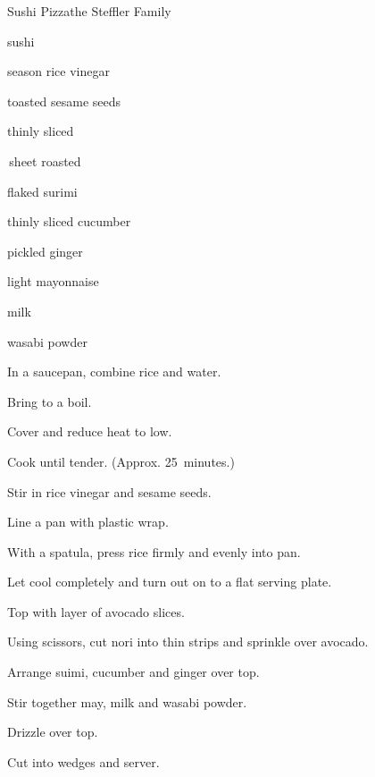 \begin{recipe}{Sushi Pizza}{the Steffler Family}{}

\begin{ingredients}
\item {} sushi 
\item \C{\quarter} season rice vinegar
\item {} toasted sesame seeds
\item \half thinly sliced 
\item \half\,sheet roasted 
\item \C{\threequarter} flaked surimi
\item \C{\half} thinly sliced cucumber
\item {} pickled ginger
\item {} light mayonnaise
\item {} milk
\item {} wasabi powder
\end{ingredients}

\begin{directions}
\item In a saucepan, combine rice and \C{1\quarter} water.
\item Bring to a boil.
\item Cover and reduce heat to low.
\item Cook until tender. (Approx. 25~minutes.)
\item Stir in rice vinegar and sesame seeds.
\item Line a pan with plastic wrap.
\item With a spatula, press rice firmly and evenly into pan.
\item Let cool completely and turn out on to a flat serving plate.
\item Top with layer of avocado slices.
\item Using scissors, cut nori into thin strips and sprinkle over avocado.
\item Arrange suimi, cucumber and ginger over top.
\item Stir together may, milk and wasabi powder.
\item Drizzle over top.
\item Cut into wedges and server.
\end{directions}
\end{recipe}
